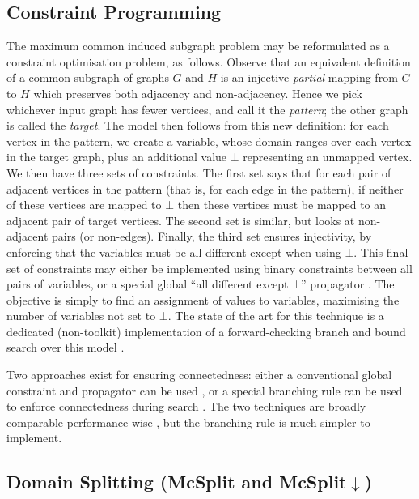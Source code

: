 \documentclass{llncs}
\begin{document}
\subsection{Constraint Programming}

The maximum common induced subgraph problem may be reformulated as a constraint optimisation
problem, as follows.  Observe that an equivalent definition of a common subgraph of graphs $G$ and
$H$ is an injective \emph{partial} mapping from $G$ to $H$ which preserves both adjacency and
non-adjacency.  Hence we pick whichever input graph has fewer vertices, and call it the
\emph{pattern}; the other graph is called the \emph{target}. The model then follows from this new
definition: for each vertex in the pattern, we create a variable, whose domain ranges over each
vertex in the target graph, plus an additional value $\bot$ representing an unmapped vertex. We then
have three sets of constraints.  The first set says that for each pair of adjacent vertices in the
pattern (that is, for each edge in the pattern), if neither of these vertices are mapped to $\bot$
then these vertices must be mapped to an adjacent pair of target vertices. The second set is
similar, but looks at non-adjacent pairs (or non-edges).  Finally, the third set ensures
injectivity, by enforcing that the variables must be all different except when using $\bot$. This
final set of constraints may either be implemented using binary constraints between all pairs of
variables, or a special global ``all different except $\bot$'' propagator
\cite{DBLP:conf/cp/PetitRB01}. The objective is simply to find an assignment of values to
variables, maximising the number of variables not set to $\bot$. The state of the art for this
technique is a dedicated (non-toolkit) implementation of a forward-checking branch and bound search
over this model \cite{DBLP:conf/cp/NdiayeS11,DBLP:conf/cp/McCreeshNPS16}.

Two approaches exist for ensuring connectedness: either a conventional global constraint and
propagator can be used \cite{DBLP:conf/cp/McCreeshNPS16}, or a special branching rule can be used
to enforce connectedness during search \cite{DBLP:conf/mco/VismaraV08}. The two techniques are
broadly comparable performance-wise \cite{DBLP:conf/cp/McCreeshNPS16}, but the branching rule is
much simpler to implement.

\subsection{Domain Splitting (McSplit and McSplit$\downarrow$)}
\end{document}
